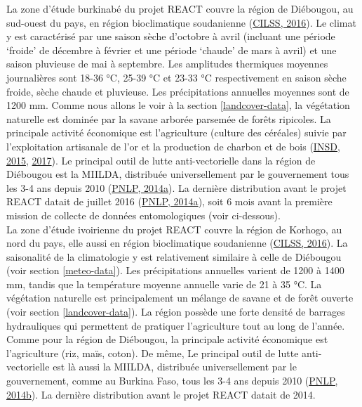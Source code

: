 \documentclass[12pt,twoside]{reedthesis}
\begin{document}
La zone d'étude burkinabé du projet REACT couvre la région de Diébougou, au sud-ouest du pays, en région bioclimatique soudanienne (\protect\hyperlink{ref-cilss_2016_landscapes_nodate}{CILSS, 2016}). Le climat y est caractérisé par une saison sèche d'octobre à avril (incluant une période `froide' de décembre à février et une période `chaude' de mars à avril) et une saison pluvieuse de mai à septembre. Les amplitudes thermiques moyennes journalières sont 18-36 °C, 25-39 °C et 23-33 °C respectivement en saison sèche froide, sèche chaude et pluvieuse. Les précipitations annuelles moyennes sont de 1200 mm. Comme nous allons le voir à la section \ref{landcover-data}, la végétation naturelle est dominée par la savane arborée parsemée de forêts ripicoles. La principale activité économique est l'agriculture (culture des céréales) suivie par l'exploitation artisanale de l'or et la production de charbon et de bois (\protect\hyperlink{ref-INSD_1}{INSD, 2015}, \protect\hyperlink{ref-INSD_2}{2017}). Le principal outil de lutte anti-vectorielle dans la région de Diébougou est la MIILDA, distribuée universellement par le gouvernement tous les 3-4 ans depuis 2010 (\protect\hyperlink{ref-PNLP_BF}{PNLP, 2014a}). La dernière distribution avant le projet REACT datait de juillet 2016 (\protect\hyperlink{ref-PNLP_BF}{PNLP, 2014a}), soit 6 mois avant la première mission de collecte de données entomologiques (voir ci-dessous).\\

La zone d'étude ivoirienne du projet REACT couvre la région de Korhogo, au nord du pays, elle aussi en région bioclimatique soudanienne (\protect\hyperlink{ref-cilss_2016_landscapes_nodate}{CILSS, 2016}). La saisonalité de la climatologie y est relativement similaire à celle de Diébougou (voir section \ref{meteo-data}). Les précipitations annuelles varient de 1200 à 1400 mm, tandis que la température moyenne annuelle varie de 21 à 35 °C. La végétation naturelle est principalement un mélange de savane et de forêt ouverte (voir section \ref{landcover-data}). La région possède une forte densité de barrages hydrauliques qui permettent de pratiquer l'agriculture tout au long de l'année. Comme pour la région de Diébougou, la principale activité économique est l'agriculture (riz, maïs, coton). De même, Le principal outil de lutte anti-vectorielle est là aussi la MIILDA, distribuée universellement par le gouvernement, comme au Burkina Faso, tous les 3-4 ans depuis 2010 (\protect\hyperlink{ref-PNLP_CI}{PNLP, 2014b}). La dernière distribution avant le projet REACT datait de 2014.\\
\end{document}
